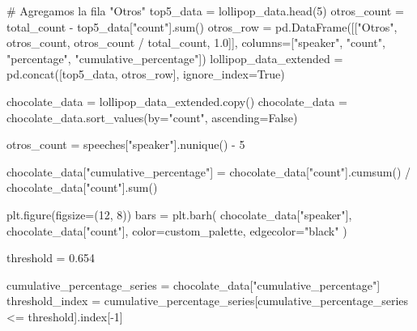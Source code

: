 \documentclass[
  letterpaper,
  DIV=11,
  numbers=noendperiod]{scrartcl}
\newenvironment{Shaded}{\begin{snugshade}}{\end{snugshade}}
\newcommand{\BuiltInTok}[1]{\textcolor[rgb]{0.00,0.23,0.31}{#1}}
\newcommand{\CommentTok}[1]{\textcolor[rgb]{0.37,0.37,0.37}{#1}}
\newcommand{\DecValTok}[1]{\textcolor[rgb]{0.68,0.00,0.00}{#1}}
\newcommand{\FloatTok}[1]{\textcolor[rgb]{0.68,0.00,0.00}{#1}}
\newcommand{\NormalTok}[1]{\textcolor[rgb]{0.00,0.23,0.31}{#1}}
\newcommand{\OperatorTok}[1]{\textcolor[rgb]{0.37,0.37,0.37}{#1}}
\newcommand{\StringTok}[1]{\textcolor[rgb]{0.13,0.47,0.30}{#1}}
\newcommand{\VariableTok}[1]{\textcolor[rgb]{0.07,0.07,0.07}{#1}}
\begin{document}
\begin{Shaded}
\begin{Highlighting}[]
\CommentTok{\# Agregamos la fila "Otros"}
\NormalTok{top5\_data }\OperatorTok{=}\NormalTok{ lollipop\_data.head(}\DecValTok{5}\NormalTok{)}
\NormalTok{otros\_count }\OperatorTok{=}\NormalTok{ total\_count }\OperatorTok{{-}}\NormalTok{ top5\_data[}\StringTok{"count"}\NormalTok{].}\BuiltInTok{sum}\NormalTok{()}
\NormalTok{otros\_row }\OperatorTok{=}\NormalTok{ pd.DataFrame([[}\StringTok{"Otros"}\NormalTok{, otros\_count, otros\_count }\OperatorTok{/}\NormalTok{ total\_count, }\FloatTok{1.0}\NormalTok{]], }
\NormalTok{                         columns}\OperatorTok{=}\NormalTok{[}\StringTok{"speaker"}\NormalTok{, }\StringTok{"count"}\NormalTok{, }\StringTok{"percentage"}\NormalTok{, }\StringTok{"cumulative\_percentage"}\NormalTok{])}
\NormalTok{lollipop\_data\_extended }\OperatorTok{=}\NormalTok{ pd.concat([top5\_data, otros\_row], ignore\_index}\OperatorTok{=}\VariableTok{True}\NormalTok{)}

\NormalTok{chocolate\_data }\OperatorTok{=}\NormalTok{ lollipop\_data\_extended.copy()}
\NormalTok{chocolate\_data }\OperatorTok{=}\NormalTok{ chocolate\_data.sort\_values(by}\OperatorTok{=}\StringTok{"count"}\NormalTok{, ascending}\OperatorTok{=}\VariableTok{False}\NormalTok{)  }

\NormalTok{otros\_count }\OperatorTok{=}\NormalTok{ speeches[}\StringTok{"speaker"}\NormalTok{].nunique() }\OperatorTok{{-}} \DecValTok{5} 

\NormalTok{chocolate\_data[}\StringTok{"cumulative\_percentage"}\NormalTok{] }\OperatorTok{=}\NormalTok{ chocolate\_data[}\StringTok{"count"}\NormalTok{].cumsum() }\OperatorTok{/}\NormalTok{ chocolate\_data[}\StringTok{"count"}\NormalTok{].}\BuiltInTok{sum}\NormalTok{()}


\NormalTok{plt.figure(figsize}\OperatorTok{=}\NormalTok{(}\DecValTok{12}\NormalTok{, }\DecValTok{8}\NormalTok{))}
\NormalTok{bars }\OperatorTok{=}\NormalTok{ plt.barh(}
\NormalTok{    chocolate\_data[}\StringTok{"speaker"}\NormalTok{],}
\NormalTok{    chocolate\_data[}\StringTok{"count"}\NormalTok{],}
\NormalTok{    color}\OperatorTok{=}\NormalTok{custom\_palette, }
\NormalTok{    edgecolor}\OperatorTok{=}\StringTok{"black"}
\NormalTok{)}

\NormalTok{threshold }\OperatorTok{=} \FloatTok{0.654}

\NormalTok{cumulative\_percentage\_series }\OperatorTok{=}\NormalTok{ chocolate\_data[}\StringTok{"cumulative\_percentage"}\NormalTok{]}
\NormalTok{threshold\_index }\OperatorTok{=}\NormalTok{ cumulative\_percentage\_series[cumulative\_percentage\_series }\OperatorTok{\textless{}=}\NormalTok{ threshold].index[}\OperatorTok{{-}}\DecValTok{1}\NormalTok{]}



\end{Highlighting}
\end{Shaded}
\end{document}
